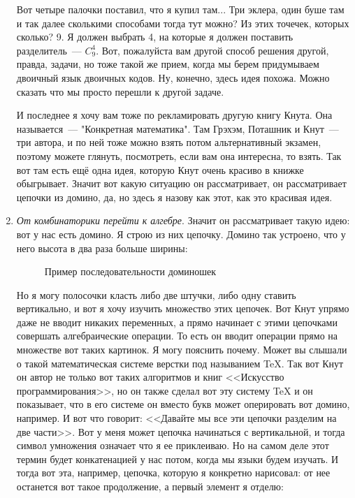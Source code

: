 \documentclass[russian]{lecture-notes}
\theoremstyle{definition}
\begin{document}
\begin{enumerate}
		Вот четыре палочки поставил, что я купил там... Три эклера, один буше там и так далее сколькими способами тогда тут можно? Из этих точечек, которых сколько? 9. Я должен выбрать 4, на которые я должен поставить разделитель~--- $C_9^4$. Вот, пожалуйста вам другой способ решения другой, правда, задачи, но тоже такой же прием, когда мы берем придумываем двоичный язык двоичных кодов. Ну, конечно, здесь идея похожа. Можно сказать что мы просто перешли к другой задаче. 
		
		
		И последнее я хочу вам тоже по рекламировать другую книгу Кнута. Она называется~--- "Конкретная математика". Там Грэхэм, Поташник и Кнут~--- три автора, и по ней тоже можно взять потом альтернативный экзамен, поэтому можете глянуть, посмотреть, если вам она интересна, то взять. Так вот там есть ещё одна идея, которую Кнут очень красиво в книжке обыгрывает. Значит вот какую ситуацию он рассматривает, он рассматривает цепочки из домино, да, но здесь я назову как этот, как это красивая идея.
		
		
		\item \emph{От комбинаторики перейти к алгебре}. Значит он рассматривает такую идею: вот у нас есть домино. Я строю из них цепочку. Домино так устроено, что у него высота в два раза больше ширины:
		
		\begin{figure}[H]
			\centering
			\caption{\small Пример последовательности доминошек}
		\end{figure}
		
		Но я могу полосочки класть либо две штучки, либо одну ставить вертикально, и вот я хочу изучить множество этих цепочек. Вот Кнут упрямо даже не вводит никаких переменных, а прямо начинает с этими цепочками совершать алгебраические операции. То есть он вводит операции прямо на множестве вот таких картинок. Я могу пояснить почему. Может вы слышали о такой математическая системе верстки под называнием TeX. Так вот Кнут он автор не только вот таких алгоритмов и книг <<Искусство программирования>>, но он также сделал вот эту систему TeX и он показывает, что в его системе он вместо букв может оперировать вот домино, например. И вот что говорит: <<Давайте мы все эти цепочки разделим на две части>>. Вот у меня может цепочка начинаться с вертикальной, и тогда символ умножения означает что я ее приклеиваю. Но на самом деле этот термин будет конкатенацией у нас потом, когда мы языки будем изучать. И тогда вот эта, например, цепочка, которую я конкретно нарисовал: от нее останется вот такое продолжение, а первый элемент я отделю:
		

\end{enumerate}
\end{document}
